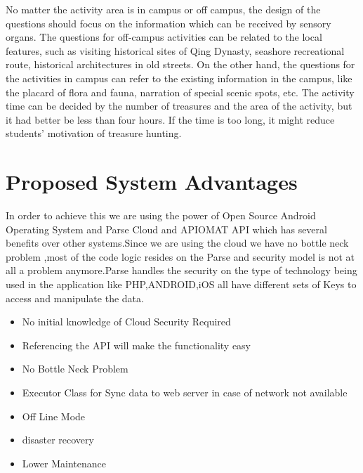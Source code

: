 \documentclass[11.4pt,a4paper,times]{report}
\begin{document}
	No matter the activity area is in campus or off campus, the design of the questions should focus on the information which can be received by sensory organs. The questions for off-campus activities can be related to the local features, such as visiting historical sites of Qing Dynasty, seashore recreational route, historical architectures in old streets. On the other hand, the questions for the activities in campus can refer to the existing information in the campus, like the placard of flora and fauna, narration of special scenic spots, etc. The activity time can be decided by the number of treasures and the area of the activity, but it had better be less than four hours. If the time is too long, it might reduce students’ motivation of treasure hunting.
	
	
	
	
	
	
	\section{Proposed  System Advantages}
	In order to achieve this we are using the power of Open Source Android Operating System and Parse Cloud and APIOMAT API which has several benefits over other systems.Since we are using the cloud we have no bottle neck problem ,most of the code logic resides on the Parse
	and security model is not at all a problem anymore.Parse handles the security on the type of technology being used in the application like PHP,ANDROID,iOS all have different sets of Keys to access and manipulate the data.
	
	
	
	\begin{itemize}
	
	
	
	 \item No initial knowledge of Cloud Security Required
	\item Referencing the API will make the functionality easy
	\item  No Bottle Neck Problem 
	\item Executor Class for Sync data to web server in case of network not available
	\item Off Line Mode
	\item  disaster recovery
	\item Lower Maintenance  
	
	
	
	\end{itemize}
	
	
	
\end{document}
